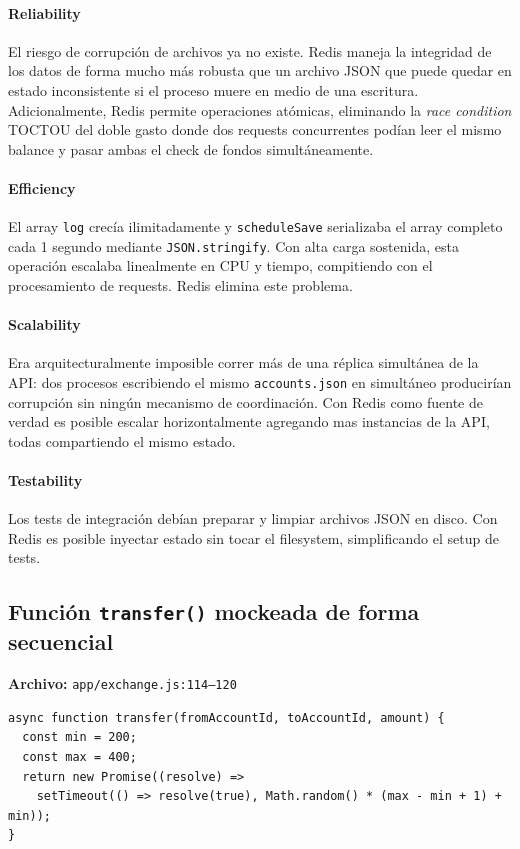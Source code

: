 \paragraph{Reliability}
El riesgo de corrupción de archivos ya no existe. Redis maneja la integridad de los datos de forma mucho más robusta que un archivo JSON que puede quedar en estado inconsistente si el proceso muere en medio de una escritura. Adicionalmente, Redis permite operaciones atómicas, eliminando la \textit{race condition} TOCTOU del doble gasto donde dos requests concurrentes podían leer el mismo balance y pasar ambas el check de fondos simultáneamente.

\paragraph{Efficiency}
El array \texttt{log} crecía ilimitadamente y \texttt{scheduleSave} serializaba el array completo cada 1 segundo mediante \texttt{JSON.stringify}. Con alta carga sostenida, esta operación escalaba linealmente en CPU y tiempo, compitiendo con el procesamiento de requests. Redis elimina este problema.

\paragraph{Scalability}
Era arquitecturalmente imposible correr más de una réplica simultánea de la API: dos procesos escribiendo el mismo \texttt{accounts.json} en simultáneo producirían corrupción sin ningún mecanismo de coordinación. Con Redis como fuente de verdad es posible escalar horizontalmente agregando mas instancias de la API, todas compartiendo el mismo estado.

\paragraph{Testability}
Los tests de integración debían preparar y limpiar archivos JSON en disco. Con Redis es posible inyectar estado sin tocar el filesystem, simplificando el setup de tests.

\subsection{Función \texttt{transfer()} mockeada de forma secuencial}

\textbf{Archivo:} \texttt{app/exchange.js:114–120}

\begin{verbatim}
async function transfer(fromAccountId, toAccountId, amount) {
  const min = 200;
  const max = 400;
  return new Promise((resolve) =>
    setTimeout(() => resolve(true), Math.random() * (max - min + 1) + min));
}
\end{verbatim}

